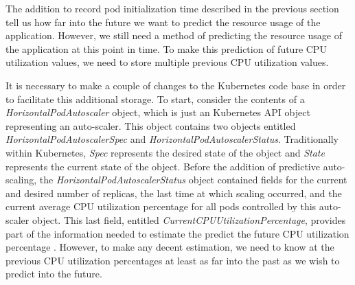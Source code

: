 The addition to record pod initialization time described in the
previous section tell us how far into the future
we want to predict the resource usage of the application. However, we still need
a method of predicting the resource usage of the application at this point in
time. To make this prediction of future CPU utilization values,
we need to store multiple previous CPU utilization values.

It is necessary to make a couple of changes to the Kubernetes code base in order
to facilitate this additional storage. To start,
consider the contents of a \textit{HorizontalPodAutoscaler} object, which is
just an Kubernetes API object representing an auto-scaler. This object contains
two objects entitled \textit{HorizontalPodAutoscalerSpec} and
\textit{HorizontalPodAutoscalerStatus}. Traditionally within
Kubernetes, \textit{Spec} represents the desired state of the object and
\textit{State} represents the current state of the object. Before the addition
of predictive auto-scaling, the \textit{HorizontalPodAutoscalerStatus} object
contained fields for the current and desired number of replicas, the last time
at which scaling occurred, and the current average CPU utilization percentage for
all pods controlled by this auto-scaler object. This last field, entitled
\textit{CurrentCPUUtilizationPercentage}, provides part of the information
needed to estimate the predict the future CPU utilization
percentage \cite{k8s-horizontal-pod-autoscaler-object}.
However, to make any decent estimation, we need to know at the previous CPU
utilization percentages at least as far into the past as we wish to predict into
the future.

